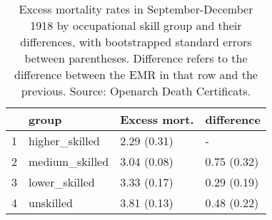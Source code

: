 \begin{table}[ht]
\centering
\begin{tabular}{rlll}
  \hline
 & group & Excess mort. & difference \\ 
  \hline
1 & higher\_skilled & 2.29 (0.31) & - \\ 
  2 & medium\_skilled & 3.04 (0.08) & 0.75 (0.32) \\ 
  3 & lower\_skilled & 3.33 (0.17) & 0.29 (0.19) \\ 
  4 & unskilled & 3.81 (0.13) & 0.48 (0.22) \\ 
   \hline
\end{tabular}
\caption{Excess mortality rates in September-December 1918 by occupational skill group and their differences, with bootstrapped standard errors between parentheses. Difference refers to the difference between the EMR in that row and the previous. Source: Openarch Death Certificats.} 
\label{lab:emr_byskill_boot}
\end{table}
